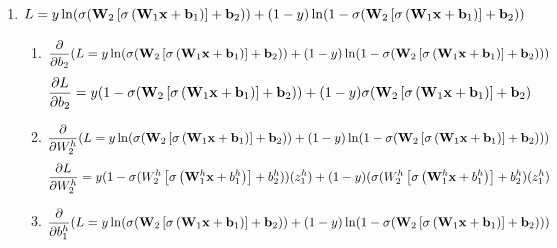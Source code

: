 \documentclass[submit]{harvardml}
\begin{document}
\begin{enumerate}
    \item
    \begin{equation*}
        L = y \ln (\sigma(\bold{W}_2 \left[\sigma \left(\bold{W}_1 \bold{x} + \bold{b}_1\right)\right] + \bold{b}_2)) + (1 - y) \ln (1 - \sigma(\bold{W}_2 \left[\sigma \left(\bold{W}_1 \bold{x} + \bold{b}_1\right)\right] + \bold{b}_2))
    \end{equation*}
    \begin{enumerate}
        \item 
    \begin{equation*}
         \frac{\partial}{\partial b_2}(L = y \ln (\sigma(\bold{W}_2 \left[\sigma \left(\bold{W}_1 \bold{x} + \bold{b}_1\right)\right] + \bold{b}_2)) + (1 - y) \ln (1 - \sigma(\bold{W}_2 \left[\sigma \left(\bold{W}_1 \bold{x} + \bold{b}_1\right)\right] + \bold{b}_2)))
    \end{equation*}
    \begin{equation*}
         \frac{\partial L}{\partial b_2} = y (1 - \sigma(\bold{W}_2 \left[\sigma \left(\bold{W}_1 \bold{x} + \bold{b}_1\right)\right] + \bold{b}_2)) + (1 - y) \sigma(\bold{W}_2 \left[\sigma \left(\bold{W}_1 \bold{x} + \bold{b}_1\right)\right] + \bold{b}_2)
    \end{equation*}
    \item
    \begin{equation*}
        \frac{\partial}{\partial W_2^h}(L = y \ln (\sigma(\bold{W}_2 \left[\sigma \left(\bold{W}_1 \bold{x} + \bold{b}_1\right)\right] + \bold{b}_2)) + (1 - y) \ln (1 - \sigma(\bold{W}_2 \left[\sigma \left(\bold{W}_1 \bold{x} + \bold{b}_1\right)\right] + \bold{b}_2)))
    \end{equation*}
    \begin{equation*}
        \frac{\partial L}{\partial W_2^h} = y 
        (1 - \sigma(W_2^h \left[\sigma \left(\bold{W}_1^h \bold{x} + b_1^h\right)\right] + b_2^h)) (z_1^h) + (1 - y) (\sigma(W_2^h \left[\sigma \left(\bold{W}_1^h \bold{x} + b_1^h\right)\right] + b_2^h)(z_1^h)
    \end{equation*}
    \item
    \begin{equation*}    
        \frac{\partial}{\partial b_1^h}(L = y \ln (\sigma(\bold{W}_2 \left[\sigma \left(\bold{W}_1 \bold{x} + \bold{b}_1\right)\right] + \bold{b}_2)) + (1 - y) \ln (1 - \sigma(\bold{W}_2 \left[\sigma \left(\bold{W}_1 \bold{x} + \bold{b}_1\right)\right] + \bold{b}_2)))
    \end{equation*}
    \begin{equation*}

\end{equation*}
\end{enumerate}
\end{enumerate}
\end{document}
